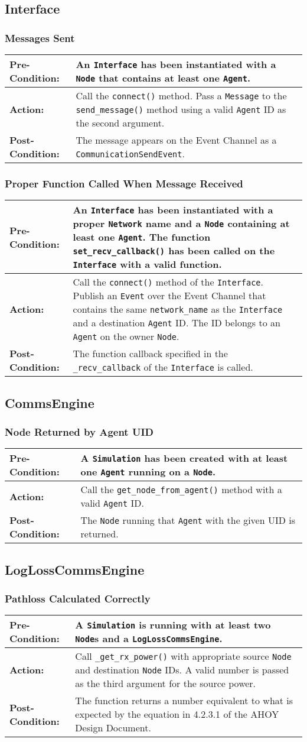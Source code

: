 \documentclass[titlepage]{article}
\newcommand{\testcase}[3]{
    \begin{center}
    \begin{tabular}{| l | p{0.7\textwidth}|}
        \hline
        \rowcolor[gray]{0.8}\textbf{Pre-Condition:} & #1 \\ \hline
        \textbf{Action:} & #2 \\ \hline
        \rowcolor[gray]{0.8}\textbf{Post-Condition:} & #3 \\ \hline
    \end{tabular}
    \end{center}
}
\begin{document}
\subsection{Interface}
\subsubsection{Messages Sent}
\testcase{An \texttt{Interface} has been instantiated with a \texttt{Node} that contains at least one \texttt{Agent}.}{Call the \texttt{connect()} method. Pass a \texttt{Message} to the \texttt{send\_message()} method using a valid \texttt{Agent} ID as the second argument.}{The message appears on the Event Channel as a \texttt{CommunicationSendEvent}.}

\subsubsection{Proper Function Called When Message Received}
\testcase{An \texttt{Interface} has been instantiated with a proper \texttt{Network} name and a \texttt{Node} containing at least one \texttt{Agent}. The function \texttt{set\_recv\_callback()} has been called on the \texttt{Interface} with a valid function.}{Call the \texttt{connect()} method of the \texttt{Interface}. Publish an \texttt{Event} over the Event Channel that contains the same \texttt{network\_name} as the \texttt{Interface} and a destination \texttt{Agent} ID. The ID belongs to an \texttt{Agent} on the owner \texttt{Node}.}{The function callback specified in the \texttt{\_recv\_callback} of the \texttt{Interface} is called.}

\subsection{CommsEngine}
\subsubsection{Node Returned by Agent UID}
\testcase{A \texttt{Simulation} has been created with at least one \texttt{Agent} running on a \texttt{Node}.}{Call the \texttt{get\_node\_from\_agent()} method with a valid \texttt{Agent} ID.}{The \texttt{Node} running that \texttt{Agent} with the given UID is returned.}

\subsection{LogLossCommsEngine}
\subsubsection{Pathloss Calculated Correctly}
\testcase{A \texttt{Simulation} is running with at least two \texttt{Node}s and a \texttt{LogLossCommsEngine}. }{Call \texttt{\_get\_rx\_power()} with appropriate source \texttt{Node} and destination \texttt{Node} IDs. A valid number is passed as the third argument for the source power.}{The function returns a number equivalent to what is expected by the equation in 4.2.3.1 of the AHOY Design Document.}
\end{document}
